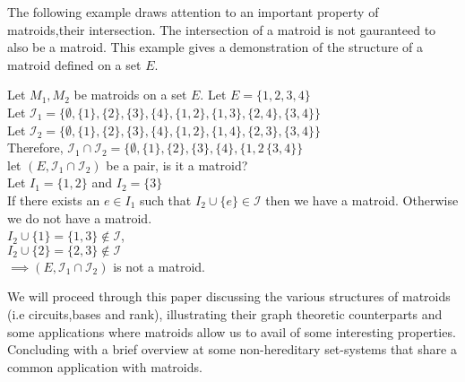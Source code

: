 \documentclass[../main.tex]{subfiles}
\begin{document}
The following example draws attention to an important property of matroids,their intersection. The intersection of a matroid is not gauranteed to also be a matroid. This example gives a demonstration of the structure of a matroid defined on a set $E.$
\begin{exmp}Let $M_1, M_2$ be matroids on a set $E.$ Let $E=\{1,2,3,4\}$\\
\noindent Let $\mathcal{I}_1 = \{\emptyset, \{1\},\{2\},\{3\},\{4\},\{1,2\},\{1,3\},\{2,4\},\{3,4\}\}$\\
\noindent Let $\mathcal{I}_2 = \{\emptyset, \{1\},\{2\},\{3\},\{4\},\{1,2\},\{1,4\},\{2,3\},\{3,4\}\}$\\
\noindent Therefore, $\mathcal{I}_1 \cap \mathcal{I}_2 = \{\emptyset, \{1\},\{2\},\{3\},\{4\},\{1,2\,\{3,4\}\}$\\
let $(E, \mathcal{I}_1 \cap \mathcal{I}_2)$ be a pair, is it a matroid?\\
Let $I_1 = \{1,2\}$ and $I_2=\{3\}$\\
If there exists an $e \in I_1$ such that $I_2 \cup \{e\} \in \mathcal{I}$ then we have a matroid. Otherwise we do not have a matroid.\\
$I_2 \cup \{1\} = \{1,3\} \notin \mathcal{I}$,\\
$I_2 \cup \{2\} = \{2,3\} \notin \mathcal{I}$\\
\noindent $\implies (E, \mathcal{I}_1 \cap \mathcal{I}_2)$ is not a matroid.
\end{exmp}
\noindent We will proceed through this paper discussing the various structures of matroids (i.e circuits,bases and rank), illustrating their graph theoretic counterparts and some applications where matroids allow us to avail of some interesting properties. Concluding with a brief overview at some non-hereditary set-systems that share a common application with matroids.
\end{document}
